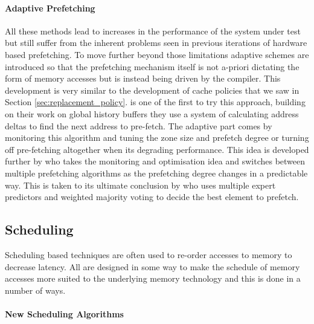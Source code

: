 \paragraph{Adaptive Prefetching}

All these methods lead to increases in the performance of the system under test but still suffer from the inherent problems seen in previous iterations of hardware based prefetching. To move further beyond those limitations adaptive schemes are introduced so that the prefetching mechanism itself is not a-priori dictating the form of memory accesses but is instead being driven by the compiler. This development is very similar to the development of cache policies that we saw in Section \ref{sec:replacement_policy}. \citet{nesbitACDCAdaptive2004} is one of the first to try this approach, building on their work on global history buffers \cite{nesbitDataCachePrefetching2004} they use a system of calculating address deltas to find the next address to pre-fetch. The adaptive part comes by monitoring this algorithm and tuning the zone size and prefetch degree or turning off pre-fetching altogether when its degrading performance. This idea is developed further by \citet{aroraCompositeDataPrefetcher2014} who takes the monitoring and optimisation idea and switches between multiple prefetching algorithms as the prefetching degree changes in a predictable way. This is taken to its ultimate conclusion by \citet{pandaExpertPrefetchPrediction2016} who uses multiple expert predictors and weighted majority voting to decide the best element to prefetch.

\subsection{Scheduling}

Scheduling based techniques are often used to re-order accesses to memory to decrease latency. All are designed in some way to make the schedule of memory accesses more suited to the underlying memory technology and this is done in a number of ways. 

\paragraph{New Scheduling Algorithms}

